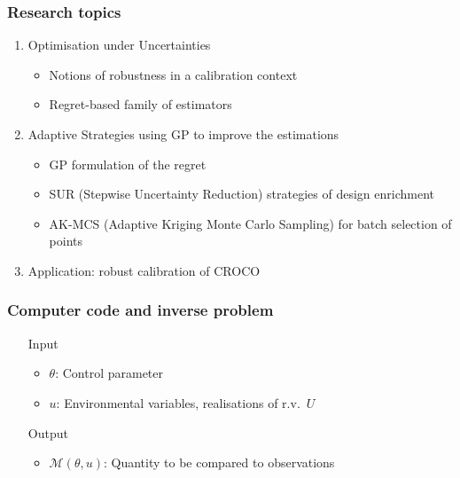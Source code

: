 \documentclass[11pt]{beamer}
\newcommand{\kk}{\theta}
\newcommand{\uu}{u}
\newcommand{\UU}{U}
\begin{document}




\begin{frame}
  \frametitle{Research topics}
  \begin{enumerate}
  \item Optimisation under Uncertainties
    \begin{itemize}
    \item Notions of robustness in a calibration context
    \item Regret-based family of estimators
    \end{itemize}



  \item Adaptive Strategies using GP to improve the estimations
    \begin{itemize}
    \item GP formulation of the regret
    \item SUR (Stepwise Uncertainty Reduction) strategies of design enrichment
    \item AK-MCS (Adaptive Kriging Monte Carlo Sampling) for batch selection of points
    \end{itemize}


    
  \item Application: robust calibration of CROCO
  \end{enumerate}
\end{frame}

\begin{frame}[t]
\frametitle{Computer code and inverse problem}
\begin{itemize}
	\item[Input] 
	\begin{itemize}
		\item $\kk$: Control parameter
		\item $\uu$: Environmental variables, realisations of r.v.\ $\UU$
	\end{itemize}
	\item[Output] \begin{itemize}
          \item $\mathcal{M}(\kk,\uu)$: Quantity to be compared to observations%
	\end{itemize}
      \end{itemize}
      \vfill
      {}
    \end{frame}
\end{document}
